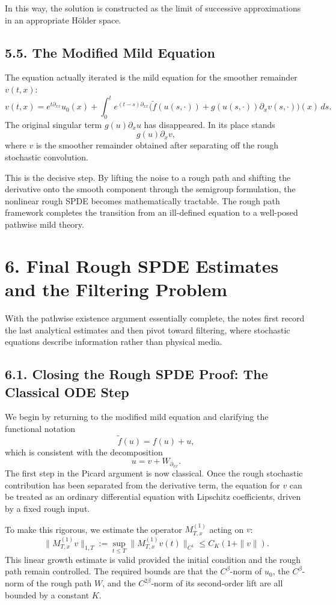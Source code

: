 \documentclass[11pt]{article}
\theoremstyle{definition}
\theoremstyle{remark}
\begin{document}
In this way, the solution is constructed as the limit of successive approximations in an appropriate Hölder space.

\subsection*{5.5. The Modified Mild Equation}
The equation actually iterated is the mild equation for the smoother remainder \(v(t,x)\):
\[
v(t,x)
=
e^{t\partial_{xx}}u_0(x)
+
\int_0^t e^{(t-s)\partial_{xx}}
\bigl(
\widetilde f(u(s,\cdot))
+
g(u(s,\cdot))\partial_x v(s,\cdot)
\bigr)(x)\,ds.
\]
The original singular term \(g(u)\partial_x u\) has disappeared. In its place stands
\[
g(u)\partial_x v,
\]
where \(v\) is the smoother remainder obtained after separating off the rough stochastic convolution.

This is the decisive step. By lifting the noise to a rough path and shifting the derivative onto the smooth component through the semigroup formulation, the nonlinear rough SPDE becomes mathematically tractable. The rough path framework completes the transition from an ill-defined equation to a well-posed pathwise mild theory.

\section*{6. Final Rough SPDE Estimates and the Filtering Problem}
With the pathwise existence argument essentially complete, the notes first record the last analytical estimates and then pivot toward filtering, where stochastic equations describe information rather than physical media.

\subsection*{6.1. Closing the Rough SPDE Proof: The Classical ODE Step}
We begin by returning to the modified mild equation and clarifying the functional notation
\[
\widetilde f(u)=f(u)+u,
\]
which is consistent with the decomposition
\[
u=v+W_{\partial_{xx}}.
\]
The first step in the Picard argument is now classical. Once the rough stochastic contribution has been separated from the derivative term, the equation for \(v\) can be treated as an ordinary differential equation with Lipschitz coefficients, driven by a fixed rough input.

To make this rigorous, we estimate the operator \(M_{T,x}^{(1)}\) acting on \(v\):
\[
\|M_{T,x}^{(1)}v\|_{1,T}
:=
\sup_{t\le T}\|M_{T,x}^{(1)}v(t)\|_{C^1}
\le
C_K(1+\|v\|).
\]
This linear growth estimate is valid provided the initial condition and the rough path remain controlled. The required bounds are that the \(C^\beta\)-norm of \(u_0\), the \(C^\beta\)-norm of the rough path \(W\), and the \(C^{2\beta}\)-norm of its second-order lift are all bounded by a constant \(K\).
\end{document}
